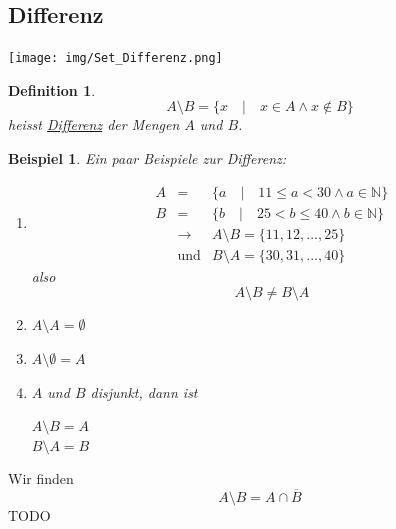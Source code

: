 \documentclass{report}
\newtheorem{mydef}{Definition}
\newtheorem{myexample}{Beispiel}
\begin{document}
\subsection{Differenz}
\begin{center}\texttt{[image: img/Set\_Differenz.png]}\end{center}
\begin{mydef}\begin{equation}A \setminus B = \{x \quad | \quad x \in A \land x \not \in B\}\end{equation}
heisst \underline{Differenz} der Mengen $A$ und $B$.\end{mydef}
\begin{myexample}Ein paar Beispiele zur Differenz:\begin{enumerate}\item \begin{eqnarray}A & = & \{a \quad | \quad 11 \leq a < 30 \land a \in \mathbb{N}\} \\ \nonumber
B & = & \{b \quad | \quad 25 < b \leq 40 \land b \in \mathbb{N}\} \\ \nonumber
& \to & A \setminus B = \{11, 12, ..., 25\} \\ \nonumber
& \mbox{und} & B \setminus A = \{30, 31, ..., 40\}\end{eqnarray}
also
\begin{equation}A \setminus B \neq B \setminus A\end{equation}
\item $A \setminus A = \emptyset$
\item $A \setminus \emptyset = A$
\item $A$ und $B$ disjunkt, dann ist
\begin{center}$A \setminus B = A$\\
$B \setminus A = B$\end{center}
\end{enumerate}\end{myexample}
Wir finden
\begin{equation}A \setminus B = A \cap \overline{B}\end{equation}
TODO %
\end{document}
